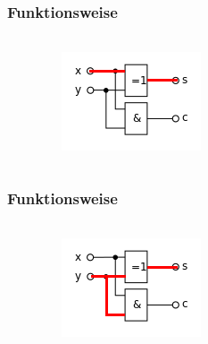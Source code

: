 \begin{frame}
    \frametitle{Funktionsweise}
    \framesubtitle{}
    \begin{columns}[c]
            \begin{center}
            \end{center}
            \begin{figure}[H]
            \begin{center}
                    \includegraphics[scale=0.6]{./img/schaltung/halbadd_fun_10.png}
            \end{center}
            \end{figure}
    \end{columns}
\end{frame}

\begin{frame}
    \frametitle{Funktionsweise}
    \framesubtitle{}
    \begin{columns}[c]
            \begin{center}
            \end{center}
            \begin{figure}[H]
            \begin{center}
                    \includegraphics[scale=0.6]{./img/schaltung/halbadd_fun_01.png}
            \end{center}
            \end{figure}
    \end{columns}
\end{frame}

